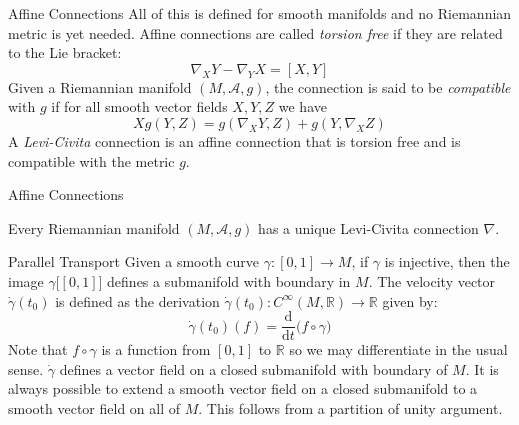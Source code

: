 \documentclass{beamer}
\begin{document}
    \begin{frame}{Affine Connections}
        All of this is defined for smooth manifolds and no Riemannian metric is
        yet needed. Affine connections are called \textit{torsion free} if they
        are related to the Lie bracket:
        \begin{equation}
            \nabla_{X}Y-\nabla_{Y}X=[X,Y]
        \end{equation}
        Given a Riemannian manifold $(M,\mathcal{A},g)$, the connection is said
        to be \textit{compatible} with $g$ if for all smooth vector fields
        $X,Y,Z$ we have
        \begin{equation}
            Xg(Y,Z)=g(\nabla_{X}Y,Z)+g(Y,\nabla_{X}Z)
        \end{equation}
        A \textit{Levi-Civita} connection is an affine connection that is
        torsion free and is compatible with the metric $g$.
    \end{frame}
    \begin{frame}{Affine Connections}
        \begin{theorem}
            Every Riemannian manifold $(M,\mathcal{A},g)$ has a unique
            Levi-Civita connection $\nabla$.
        \end{theorem}
    \end{frame}
    \begin{frame}{Parallel Transport}
        Given a smooth curve $\gamma:[0,1]\rightarrow{M}$, if $\gamma$ is
        injective, then the image $\gamma\big[[0,1]\big]$ defines a
        submanifold with boundary in $M$. The velocity vector
        $\dot{\gamma}(t_{0})$ is defined as the derivation
        $\dot{\gamma}(t_{0}):C^{\infty}(M,\mathbb{R})\rightarrow\mathbb{R}$
        given by:
        \begin{equation}
            \dot{\gamma}(t_{0})(f)=
                \frac{\textrm{d}}{\textrm{d}t}\Big(f\circ\gamma\Big)
        \end{equation}
        Note that $f\circ\gamma$ is a function from $[0,1]$ to $\mathbb{R}$ so
        we may differentiate in the usual sense. $\dot{\gamma}$ defines a vector
        field on a closed submanifold with boundary of $M$. It is always
        possible to extend a smooth vector field on a closed submanifold to a
        smooth vector field on all of $M$. This follows from a partition of
        unity argument.
    \end{frame}
\end{document}

